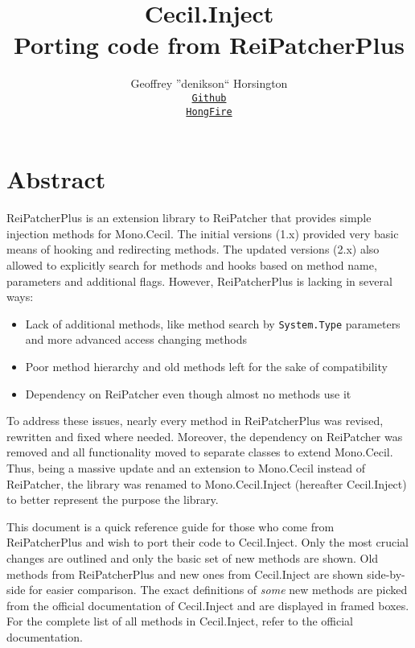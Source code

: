 \documentclass[a4paper,11pt]{article}
\newcommand{\CecilInject}{\textsc{C}{\scriptsize \sc ecil}.\textsc{I}{\scriptsize \sc nject}}
\begin{document}
\title{\textsc{C}{\large \sc ecil}.\textsc{I}{\large \sc nject} \\ \vspace{-10pt} {\Large Porting code from ReiPatcherPlus}}

\author{Geoffrey ''denikson`` Horsington \\
{\normalsize \tt \href{https://github.com/denikson}{Github}} \\
{\normalsize \tt \href{http://www.hongfire.com/forum/member.php/1347954-denikson}{HongFire}}
}
\maketitle
\section{Abstract}
ReiPatcherPlus is an extension library to ReiPatcher that provides simple injection methods for Mono.Cecil. The initial versions (1.x) provided very basic means of hooking and redirecting methods. The updated versions (2.x) also allowed to explicitly search for methods and hooks based on method name, parameters and additional flags. 
However, ReiPatcherPlus is lacking in several ways:
\begin{itemize}
\item Lack of additional methods, like method search by \texttt{System.Type} parameters and more advanced access changing methods
\item Poor method hierarchy and old methods left for the sake of compatibility
\item Dependency on ReiPatcher even though almost no methods use it
\end{itemize}
To address these issues, nearly every method in ReiPatcherPlus was revised, rewritten and fixed where needed. Moreover, the dependency on ReiPatcher was removed and all functionality moved to separate classes to extend Mono.Cecil. Thus, being a massive update and an extension to Mono.Cecil instead of ReiPatcher, the library was renamed to Mono.Cecil.Inject (hereafter \CecilInject{}) to better represent the purpose the library.

This document is a quick reference guide for those who come from ReiPatcherPlus and wish to port their code to \CecilInject{}. Only the most crucial changes are outlined and only the basic set of new methods are shown. Old methods from ReiPatcherPlus and new ones from \CecilInject{} are shown side-by-side for easier comparison. The exact definitions of \emph{some} new methods are picked from the official documentation of \CecilInject{} and are displayed in framed boxes. For the complete list of all methods in \CecilInject{}, refer to the official documentation.
\newpage
\end{document}
